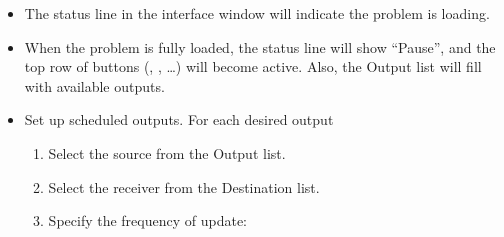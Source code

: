 \begin{list}{}{\setlength{\labelwidth}{0pt}
               \setlength{\leftmargin}{0pt}
               \setlength{\rightmargin}{\leftmargin}
               \setlength{\itemsep}{0pt}}
\begin{description}
\begin{itemize}
\begin{itemize}
          \item Double click in the  subwindow to change
                directories.  Several sample problems can be found in
                the directory .
          \item To load a problem, double click on a  file
                (e.g., stdprob1.mif) from the list above the 
                subwindow.
        \end{itemize}
        The native input format for the 3D solver is the
        format, which must be composed by hand using a plain text
        editor.  (See the  documentation for additional
        details.)  However, \MIF~1.1 (i.e., 2D problem) files are
        readable by , or may be converted to the \MIF~2.1
        format using the command line tool
        .
        also supports an extension to the \MIF~1.1
        format, namely \MIF~1.2, which provides limited 3D
        functionality.  \MIF~1.2 files may also be read directly by
        .  Either way, to run in  a problem
        created by , the problem must first be saved to
        disk via the  menu option in
        .
      \item The status line in the  interface window will
        indicate the problem is loading. 
      \item When the problem is fully loaded, the status line will
        show ``Pause'', and the top row of buttons (,
        , \ldots) will become active.  Also, the
        Output list will fill with available outputs.
      \item Set up scheduled outputs.  For each desired output
      \begin{enumerate}
         \item Select the source from the Output list.
         \item Select the receiver from the Destination list.
         \item Specify the frequency of update:
         \begin{itemize}

\end{itemize}
\end{enumerate}
\end{itemize}
\end{description}
\end{list}
